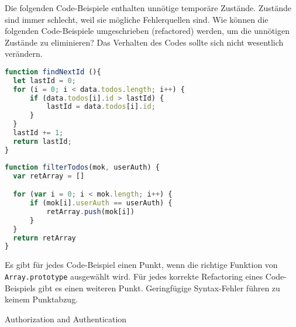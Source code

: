 \documentclass[addpoints]{exam}
\begin{document}
\begin{questions}
\begin{parts}
  Die folgenden Code-Beispiele enthalten unnötige temporäre Zustände. Zustände
  sind immer schlecht, weil sie mögliche Fehlerquellen sind. Wie können die
  folgenden Code-Beispiele umgeschrieben (refactored) werden, um die unnötigen
  Zustände zu eliminieren? Das Verhalten des Codes sollte sich nicht wesentlich
  verändern.
\begin{lstlisting}[extendedchars=true,basicstyle=\footnotesize\ttfamily,language=JavaScript]
function findNextId (){
  let lastId = 0;
  for (i = 0; i < data.todos.length; i++) {
      if (data.todos[i].id > lastId) {
          lastId = data.todos[i].id;
      }
  }
  lastId += 1;
  return lastId;
}
\end{lstlisting}
\makeemptybox{16em}

\begin{lstlisting}[extendedchars=true,basicstyle=\footnotesize\ttfamily,language=JavaScript]
function filterTodos(mok, userAuth) {
  var retArray = []

  for (var i = 0; i < mok.length; i++) {
      if (mok[i].userAuth == userAuth) {
          retArray.push(mok[i])
      }
  }
  return retArray
}
\end{lstlisting}
\makeemptybox{16em}

\begin{subparts}
  \subpart[3]
  Es gibt für jedes Code-Beispiel einen Punkt, wenn die richtige Funktion von
  \texttt{Array.prototype} ausgewählt wird.
  \subpart[3]
  Für jedes korrekte Refactoring eines Code-Beispiels gibt es einen weiteren
  Punkt. Geringfügige Syntax-Fehler führen zu keinem Punktabzug.
\end{subparts}
\end{parts}


\question Authorization and Authentication
\end{questions}
\end{document}
